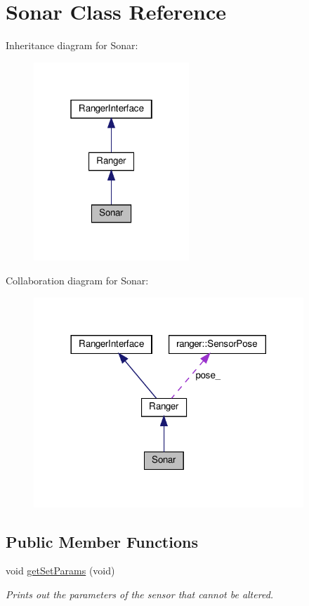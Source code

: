 \hypertarget{classSonar}{}\section{Sonar Class Reference}
\label{classSonar}


Inheritance diagram for Sonar\+:\nopagebreak
\begin{figure}[H]
\begin{center}
\leavevmode
\includegraphics[width=166pt]{classSonar__inherit__graph}
\end{center}
\end{figure}


Collaboration diagram for Sonar\+:\nopagebreak
\begin{figure}[H]
\begin{center}
\leavevmode
\includegraphics[width=288pt]{classSonar__coll__graph}
\end{center}
\end{figure}
\subsection*{Public Member Functions}
\begin{DoxyCompactItemize}
\item 
\mbox{\label{classSonar_a16d2e4d63a621d350a0ae8b494f313ad}} 
void \hyperlink{classSonar_a16d2e4d63a621d350a0ae8b494f313ad}{get\+Set\+Params} (void)
\begin{DoxyCompactList}\small\item\em Prints out the parameters of the sensor that cannot be altered. \end{DoxyCompactList}\end{DoxyCompactItemize}
